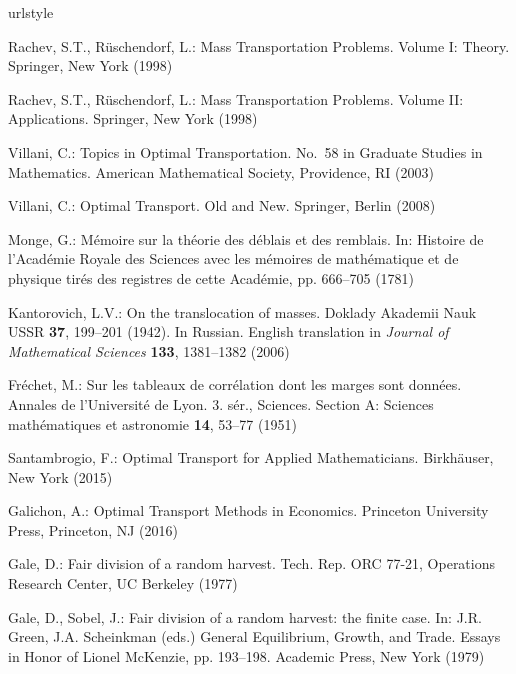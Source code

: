 \documentclass{article}
\theoremstyle{definition}
\begin{document}

\begin{thebibliography}{10}
\providecommand{\url}[1]{{#1}}
\providecommand{\urlprefix}{URL }
\expandafter\ifx\csname urlstyle\endcsname\relax
  \providecommand{\doi}[1]{DOI~\discretionary{}{}{}#1}\else
  \providecommand{\doi}{DOI~\discretionary{}{}{}\begingroup
  \urlstyle{rm}\Url}\fi

Rachev, S.T., R{\"u}schendorf, L.: Mass Transportation Problems. Volume I:
  Theory.
\newblock Springer, New York (1998)

Rachev, S.T., R{\"u}schendorf, L.: Mass Transportation Problems. Volume II:
  Applications.
\newblock Springer, New York (1998)

Villani, C.: Topics in Optimal Transportation.
\newblock No.~58 in Graduate Studies in Mathematics. American Mathematical
  Society, Providence, RI (2003)

Villani, C.: Optimal Transport. Old and New.
\newblock Springer, Berlin (2008)

Monge, G.: M\'emoire sur la th\'eorie des d\'eblais et des remblais.
\newblock In: Histoire de l'Acad\'emie Royale des Sciences avec les m\'emoires
  de math\'ematique et de physique tir\'es des registres de cette Acad\'emie,
  pp. 666--705 (1781)

Kantorovich, L.V.: On the translocation of masses.
\newblock Doklady Akademii Nauk USSR \textbf{37}, 199--201 (1942).
\newblock In Russian. English translation in \textit{Journal of Mathematical
  Sciences} {\bf 133}, 1381--1382 (2006)

Fr\'echet, M.: Sur les tableaux de corr\'elation dont les marges sont
  donn\'ees.
\newblock Annales de l'Universit\'e de Lyon. 3. s\'er., Sciences. Section A:
  Sciences math\'ematiques et astronomie \textbf{14}, 53--77 (1951)

Santambrogio, F.: Optimal Transport for Applied Mathematicians.
\newblock Birkh{\"a}user, New York (2015)

Galichon, A.: Optimal Transport Methods in Economics.
\newblock Princeton University Press, Princeton, NJ (2016)

Gale, D.: Fair division of a random harvest.
\newblock Tech. Rep. ORC 77-21, Operations Research Center, UC Berkeley (1977)

Gale, D., Sobel, J.: Fair division of a random harvest: the finite case.
\newblock In: J.R. Green, J.A. Scheinkman (eds.) General Equilibrium, Growth,
  and Trade. Essays in Honor of Lionel McKenzie, pp. 193--198. Academic Press,
  New York (1979)


\end{thebibliography}
\end{document}
